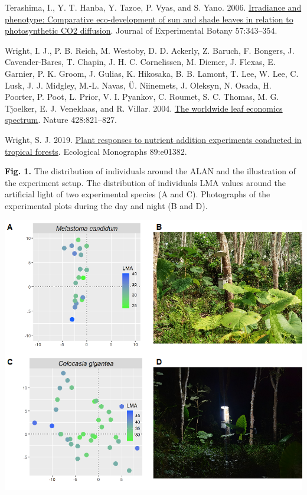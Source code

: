 \documentclass[
  12pt,
  letterpaper,
  DIV=11,
  numbers=noendperiod]{scrartcl}
\newlength{\cslhangindent}
\newlength{\cslentryspacingunit} %
\newenvironment{CSLReferences}[2] %
 {%
  \setlength{\parindent}{0pt}
  \ifodd #1
  \let\oldpar\par
  \def\par{\hangindent=\cslhangindent\oldpar}
  \fi
  \setlength{\parskip}{#2\cslentryspacingunit}
 }%
 {}
\begin{document}
\begin{CSLReferences}{1}{0}
\leavevmode{}%
Terashima, I., Y. T. Hanba, Y. Tazoe, P. Vyas, and S. Yano. 2006.
\href{https://doi.org/10.1093/jxb/erj014}{Irradiance and phenotype:
Comparative eco-development of sun and shade leaves in relation to
photosynthetic {CO2} diffusion}. Journal of Experimental Botany
57:343--354.

\leavevmode{}%
Wright, I. J., P. B. Reich, M. Westoby, D. D. Ackerly, Z. Baruch, F.
Bongers, J. Cavender-Bares, T. Chapin, J. H. C. Cornelissen, M. Diemer,
J. Flexas, E. Garnier, P. K. Groom, J. Gulias, K. Hikosaka, B. B.
Lamont, T. Lee, W. Lee, C. Lusk, J. J. Midgley, M.-L. Navas, Ü.
Niinemets, J. Oleksyn, N. Osada, H. Poorter, P. Poot, L. Prior, V. I.
Pyankov, C. Roumet, S. C. Thomas, M. G. Tjoelker, E. J. Veneklaas, and
R. Villar. 2004. \href{https://doi.org/10.1038/nature02403}{The
worldwide leaf economics spectrum}. Nature 428:821--827.

\leavevmode{}%
Wright, S. J. 2019. \href{https://doi.org/10.1002/ecm.1382}{Plant
responses to nutrient addition experiments conducted in tropical
forests}. Ecological Monographs 89:e01382.

\end{CSLReferences}

\newpage

\textbf{Fig. 1.} The distribution of individuals around the ALAN and the
illustration of the experiment setup. The distribution of individuals
LMA values around the artificial light of two experimental species (A
and C). Photographs of the experimental plots during the day and night
(B and D).

\includegraphics{../figs/merge.png}
\end{document}
